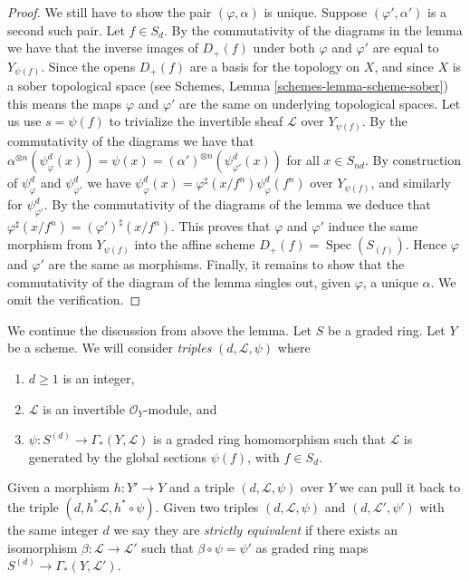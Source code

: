 \documentclass{stacks-project}
\theoremstyle{plain}
\theoremstyle{definition}
\theoremstyle{remark}
\numberwithin{equation}{subsection}
\def\Spec{\mathop{\mathrm{Spec}}}
\begin{document}
\begin{proof}
\medskip\noindent
We still have to show the pair $(\varphi, \alpha)$ is unique.
Suppose $(\varphi', \alpha')$ is a second such pair.
Let $f \in S_d$. By the commutativity of the diagrams in the lemma we have
that the inverse images of $D_{+}(f)$ under both $\varphi$ and $\varphi'$
are equal to $Y_{\psi(f)}$. Since the opens $D_{+}(f)$ are a basis
for the topology on $X$, and since $X$ is a sober topological
space (see Schemes, Lemma \ref{schemes-lemma-scheme-sober})
this means the maps $\varphi$ and $\varphi'$ are the same
on underlying topological spaces. Let us use $s = \psi(f)$ to
trivialize the invertible sheaf $\mathcal{L}$ over $Y_{\psi(f)}$.
By the commutativity of the diagrams we have that
$\alpha^{\otimes n}(\psi^d_{\varphi}(x)) =
\psi(x) = (\alpha')^{\otimes n}(\psi^d_{\varphi'}(x))$
for all $x \in S_{nd}$. By construction of $\psi^d_{\varphi}$
and $\psi^d_{\varphi'}$ we have
$\psi^d_{\varphi}(x) = \varphi^\sharp(x/f^n) \psi^d_{\varphi}(f^n)$
over $Y_{\psi(f)}$,
and similarly for $\psi^d_{\varphi'}$. By the commutativity of
the diagrams of the lemma we deduce that
$\varphi^\sharp(x/f^n) = (\varphi')^\sharp(x/f^n)$.
This proves that $\varphi$ and $\varphi'$ induce the same morphism
from $Y_{\psi(f)}$ into the affine scheme $D_{+}(f) = \Spec(S_{(f)})$.
Hence $\varphi$ and $\varphi'$ are the same as morphisms.
Finally, it remains to show that the commutativity of the
diagram of the lemma singles out, given $\varphi$, a unique
$\alpha$. We omit the verification.
\end{proof}

\noindent
We continue the discussion from above the lemma.
Let $S$ be a graded ring.
Let $Y$ be a scheme. We will consider {\it triples}
$(d, \mathcal{L}, \psi)$ where
\begin{enumerate}
\item $d \geq 1$ is an integer,
\item $\mathcal{L}$ is an invertible $\mathcal{O}_Y$-module, and
\item $\psi : S^{(d)} \to \Gamma_*(Y, \mathcal{L})$ is a graded
ring homomorphism such that $\mathcal{L}$ is generated by
the global sections $\psi(f)$, with $f \in S_d$.
\end{enumerate}
Given a morphism $h : Y' \to Y$ and a triple
$(d, \mathcal{L}, \psi)$ over $Y$ we can pull it back to the
triple $(d, h^*\mathcal{L}, h^* \circ \psi)$.
Given two triples $(d, \mathcal{L}, \psi)$ and
$(d, \mathcal{L}', \psi')$ with the same integer $d$
we say they are {\it strictly equivalent} if there exists
an isomorphism $\beta : \mathcal{L} \to \mathcal{L}'$
such that $\beta \circ \psi = \psi'$ as graded
ring maps $S^{(d)} \to \Gamma_*(Y, \mathcal{L}')$.
\end{document}
